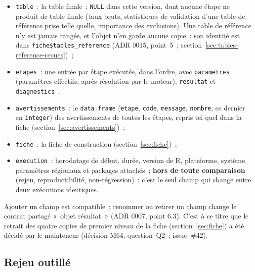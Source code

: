 \documentclass[a4paper,11pt]{article}
\newcommand{\code}[1]{\texttt{\small #1}}
\begin{document}
\begin{itemize}[leftmargin=*, itemsep=2pt]
  \item \code{table}~: la table finale~; \code{NULL} dans cette version,
    dont aucune étape ne produit de table finale (taux bruts, statistiques
    de validation d'une table de référence prise telle quelle, importance
    des exclusions). Une table de référence n'y est
    jamais rangée, et l'objet n'en garde aucune copie~: son identité est
    dans \code{fiche\$tables\_reference} (ADR 0015, point~5~;
    section~\ref{sec:tables-reference-recues})~;
  \item \code{etapes}~: une entrée par étape exécutée, dans l'ordre, avec
    \code{parametres} (paramètres effectifs, après résolution par le moteur),
    \code{resultat} et \code{diagnostics}~;
  \item \code{avertissements}~: le \code{data.frame} (\code{etape}, \code{code},
    \code{message}, \code{nombre}, ce dernier en \code{integer}) des
    avertissements de toutes les étapes, repris tel quel dans la fiche
    (section~\ref{sec:avertissements})~;
  \item \code{fiche}~: la fiche de construction (section~\ref{sec:fiche})~;
  \item \code{execution}~: horodatage de début, durée, version de R,
    plateforme, système, paramètres régionaux et packages attachés~;
    \textbf{hors de toute comparaison} (rejeu, reproductibilité,
    non-régression)~: c'est le seul champ qui change entre deux exécutions
    identiques.
\end{itemize}

\noindent
Ajouter un champ est compatible~; renommer ou retirer un champ change le
contrat partagé «~objet résultat~» (ADR 0007, point 6.3). C'est à ce titre que
le retrait des quatre copies de premier niveau de la fiche
(section~\ref{sec:fiche}) a été décidé par le mainteneur (décision M64,
question~Q2~; issue~\#42).

\subsection{Rejeu outillé}
\label{sec:rejeu}
\begingroup\sloppy
\end{document}
